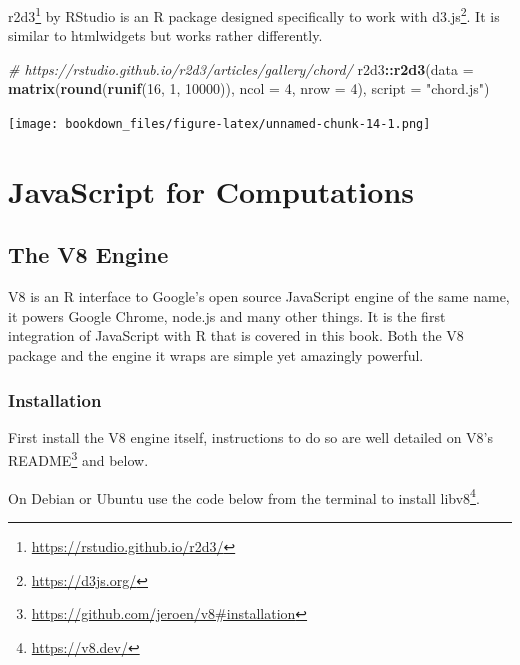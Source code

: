 \documentclass[
]{krantz}
\makeatletter
\newenvironment{Shaded}{\begin{snugshade}}{\end{snugshade}}
\newcommand{\CommentTok}[1]{\textcolor[rgb]{0.37,0.37,0.37}{\textit{#1}}}
\newcommand{\DataTypeTok}[1]{\textcolor[rgb]{0.27,0.27,0.27}{#1}}
\newcommand{\DecValTok}[1]{\textcolor[rgb]{0.06,0.06,0.06}{#1}}
\newcommand{\KeywordTok}[1]{\textcolor[rgb]{0.27,0.27,0.27}{\textbf{#1}}}
\newcommand{\NormalTok}[1]{#1}
\newcommand{\OperatorTok}[1]{\textcolor[rgb]{0.43,0.43,0.43}{\textbf{#1}}}
\newcommand{\StringTok}[1]{\textcolor[rgb]{0.5,0.5,0.5}{#1}}
\renewcommand{\href}[2]{#2\footnote{\url{#1}}}
\newenvironment{kframe}{%
\medskip{}
\setlength{\fboxsep}{.8em}
 \def\at@end@of@kframe{}%
 \ifinner\ifhmode%
  \def\at@end@of@kframe{\end{minipage}}%
  \begin{minipage}{\columnwidth}%
 \fi\fi%
 \def\FrameCommand##1{\hskip\@totalleftmargin \hskip-\fboxsep
 \colorbox{shadecolor}{##1}\hskip-\fboxsep
     \hskip-\linewidth \hskip-\@totalleftmargin \hskip\columnwidth}%
 \MakeFramed {\advance\hsize-\width
   \@totalleftmargin\z@ \linewidth\hsize
   \@setminipage}}%
 {\par\unskip\endMakeFramed%
 \at@end@of@kframe}
\renewenvironment{Shaded}{\begin{kframe}}{\end{kframe}}
\makeatother
\begin{document}
\href{https://rstudio.github.io/r2d3/}{r2d3} \citep{R-r2d3} by RStudio is an R package designed specifically to work with \href{https://d3js.org/}{d3.js}. It is similar to htmlwidgets but works rather differently.

\begin{Shaded}
\begin{Highlighting}[]
\CommentTok{\# https://rstudio.github.io/r2d3/articles/gallery/chord/}
\NormalTok{r2d3}\OperatorTok{::}\KeywordTok{r2d3}\NormalTok{(}\DataTypeTok{data =} \KeywordTok{matrix}\NormalTok{(}\KeywordTok{round}\NormalTok{(}\KeywordTok{runif}\NormalTok{(}\DecValTok{16}\NormalTok{, }\DecValTok{1}\NormalTok{, }\DecValTok{10000}\NormalTok{)), }\DataTypeTok{ncol =} \DecValTok{4}\NormalTok{, }\DataTypeTok{nrow =} \DecValTok{4}\NormalTok{), }\DataTypeTok{script =} \StringTok{"chord.js"}\NormalTok{)}
\end{Highlighting}
\end{Shaded}

\texttt{[image: bookdown\_files/figure-latex/unnamed-chunk-14-1.png]}

\hypertarget{part-javascript-for-computations}{%
\part{JavaScript for Computations}\label{part-javascript-for-computations}}

\hypertarget{the-v8-engine}{%
\chapter{The V8 Engine}\label{the-v8-engine}}

V8 is an R interface to Google's open source JavaScript engine of the same name, it powers Google Chrome, node.js and many other things. It is the first integration of JavaScript with R that is covered in this book. Both the V8 package and the engine it wraps are simple yet amazingly powerful.

\hypertarget{installation}{%
\section*{Installation}\label{installation}}


First install the V8 engine itself, instructions to do so are well detailed on \href{https://github.com/jeroen/v8\#installation}{V8's README} and below.

On Debian or Ubuntu use the code below from the terminal to install \href{https://v8.dev/}{libv8}.
\end{document}
